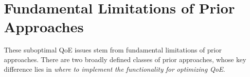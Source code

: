 \section{Fundamental Limitations of Prior Approaches}



These suboptimal QoE issues stem from fundamental limitations of prior 
approaches. There are two broadly defined classes of prior approaches,
whose key difference lies in
{\em where to implement the functionality for optimizing QoE}.



